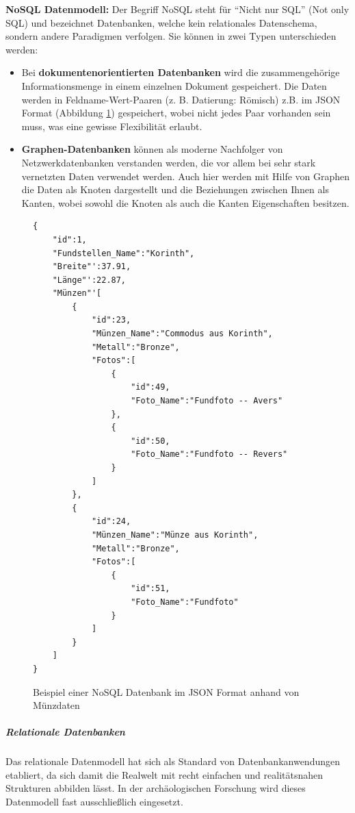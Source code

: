 {\bfseries NoSQL Datenmodell:} Der Begriff NoSQL steht für "`Nicht nur SQL"' (Not only SQL) und bezeichnet Datenbanken, welche kein relationales Datenschema, sondern andere Paradigmen verfolgen. Sie können in zwei Typen unterschieden werden:
\begin{itemize}
	\item Bei \textbf{dokumentenorientierten Datenbanken} wird die zusammengehörige Informationsmenge in einem einzelnen Dokument gespeichert. Die Daten werden in Feldname-Wert-Paaren (z. B. Datierung: Römisch) z.B. im JSON Format (Abbildung \ref{abb:datenbanken-nosql}) gespeichert, wobei nicht jedes Paar vorhanden sein muss, was eine gewisse Flexibilität erlaubt.
	\item \textbf{Graphen-Datenbanken} können als moderne Nachfolger von Netzwerkdatenbanken verstanden werden, die vor allem bei sehr stark vernetzten Daten verwendet werden. Auch hier werden mit Hilfe von Graphen die Daten als Knoten dargestellt und die Beziehungen zwischen Ihnen als Kanten, wobei sowohl die Knoten als auch die Kanten Eigenschaften besitzen.
\end{itemize}

\begin{figure}[!htb]
\begin{center}
\lstset{language=HTML} %
\begin{lstlisting}[frame=L, xleftmargin=0.3cm, rulecolor=\color{ianusGrau}, basicstyle=\footnotesize]
{
	"id":1,
	"Fundstellen_Name":"Korinth",
	"Breite"':37.91,
	"Länge"':22.87,
	"Münzen"'[
		{
			"id":23,
			"Münzen_Name":"Commodus aus Korinth",
			"Metall":"Bronze",
			"Fotos":[
				{
					"id":49,
					"Foto_Name":"Fundfoto -- Avers"
				},
				{
					"id":50,
					"Foto_Name":"Fundfoto -- Revers"
				}
			]
		},
		{
			"id":24,
			"Münzen_Name":"Münze aus Korinth",
			"Metall":"Bronze",
			"Fotos":[
				{
					"id":51,
					"Foto_Name":"Fundfoto"
				}
			]
		}
	]
}		
\end{lstlisting}
\end{center}
\caption{Beispiel einer NoSQL Datenbank im JSON Format anhand von Münzdaten}
\label{abb:datenbanken-nosql}
\end{figure}

\subparagraph{Relationale Datenbanken}
Das relationale Datenmodell hat sich als Standard von Datenbankanwendungen etabliert, da sich damit die Realwelt mit recht einfachen und realitätsnahen Strukturen abbilden lässt. In der archäologischen Forschung wird dieses Datenmodell fast ausschließlich eingesetzt.

